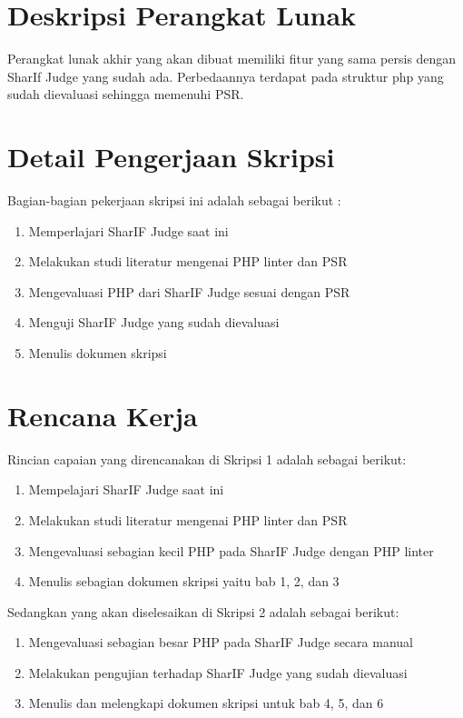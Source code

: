 \documentclass[a4paper,twoside]{article}
\begin{document}
\section{Deskripsi Perangkat Lunak}
Perangkat lunak akhir yang akan dibuat memiliki fitur yang sama persis dengan SharIf Judge yang sudah ada. Perbedaannya terdapat pada struktur php yang sudah dievaluasi sehingga memenuhi PSR.

\section{Detail Pengerjaan Skripsi}
Bagian-bagian pekerjaan skripsi ini adalah sebagai berikut :
	\begin{enumerate}
		\item Memperlajari SharIF Judge saat ini
		\item Melakukan studi literatur mengenai PHP linter dan PSR
		\item Mengevaluasi PHP dari SharIF Judge sesuai dengan PSR
		\item Menguji SharIF Judge yang sudah dievaluasi
		\item Menulis dokumen skripsi
	\end{enumerate}

\section{Rencana Kerja}
Rincian capaian yang direncanakan di Skripsi 1 adalah sebagai berikut:
\begin{enumerate}
\item Mempelajari SharIF Judge saat ini
\item Melakukan studi literatur mengenai PHP linter dan PSR
\item Mengevaluasi sebagian kecil PHP pada SharIF Judge dengan PHP linter
\item Menulis sebagian dokumen skripsi yaitu bab 1, 2, dan 3
\end{enumerate}

Sedangkan yang akan diselesaikan di Skripsi 2 adalah sebagai berikut:
\begin{enumerate}
\item Mengevaluasi sebagian besar PHP pada SharIF Judge secara manual
\item Melakukan pengujian terhadap SharIF Judge yang sudah dievaluasi
\item Menulis dan melengkapi dokumen skripsi untuk bab 4, 5, dan 6

\end{enumerate}
\end{document}
